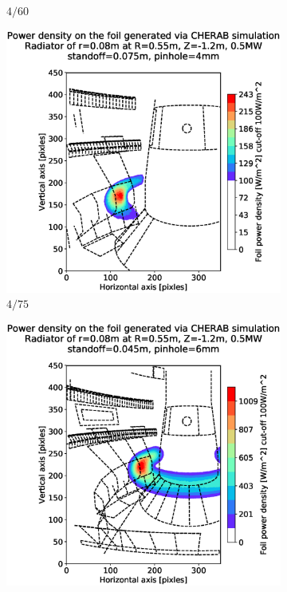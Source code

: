 \begin{figure}[!ht]
\begin{subfigure}{0.31\textwidth}
         \caption{$4/60$}
         \label{fig:4_60}
     \end{subfigure}
     \hfill
     \begin{subfigure}{0.325\textwidth}
         \centering
         \includegraphics[trim={85 25 40 80},clip,width=\textwidth]{Chapters/chapter2/figs/measured_power_4_75radiator_R0.55_Z-1.2_r0.08.stl.eps}
         \caption{$4/75$}
         \label{fig:$4_75$}
     \end{subfigure}
     \begin{subfigure}{0.32\textwidth}
         \centering
         \includegraphics[trim={85 25 49 80},clip,width=\textwidth]{Chapters/chapter2/figs/measured_power_6_45radiator_R0.55_Z-1.2_r0.08.stl.eps}

\end{subfigure}
\end{figure}

